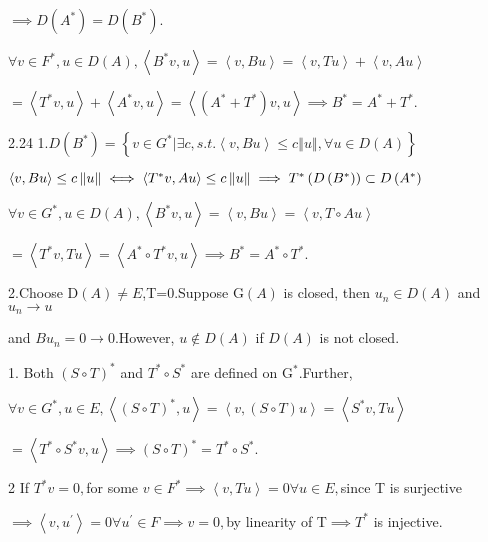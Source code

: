 \documentclass{article}
\begin{document}
$\implies D\left( A^{\ast }\right) =D\left( B^{\ast }\right) .$

$\forall v\in F^{\ast },u\in D\left( A\right) ,\left\langle B^{\ast
}v,u\right\rangle =\left\langle v,Bu\right\rangle =\left\langle
v,Tu\right\rangle +\left\langle v,Au\right\rangle $

$=\left\langle T^{\ast }v,u\right\rangle +\left\langle A^{\ast
}v,u\right\rangle =\left\langle \left( A^{\ast }+T^{\ast }\right)
v,u\right\rangle \implies B^{\ast }=A^{\ast }+T^{\ast }.$

2.24 1.$D\left( B^{\ast }\right) =\left\{ v\in G^{\ast }|\exists
c,s.t.\left\langle v,Bu\right\rangle \leq c\left\Vert u\right\Vert ,\forall
u\in D\left( A\right) \right\} $

$\bigskip \left\langle v,Bu\right\rangle \leq c\left\Vert u\right\Vert \iff
\left\langle T^{\ast }v,Au\right\rangle \leq c\left\Vert u\right\Vert
\implies T^{\ast }\left( D\left( B^{\ast }\right) \right) \subset D\left(
A^{\ast }\right) $

$\forall v\in G^{\ast },u\in D\left( A\right) ,\left\langle B^{\ast
}v,u\right\rangle =\left\langle v,Bu\right\rangle =\left\langle v,T\circ
Au\right\rangle $

$=\left\langle T^{\ast }v,Tu\right\rangle =\left\langle A^{\ast }\circ
T^{\ast }v,u\right\rangle \implies B^{\ast }=A^{\ast }\circ T^{\ast }.$

\bigskip 2.Choose D$\left( A\right) \neq E$,T=0.Suppose G$\left( A\right) $
is closed, then $u_{n}\in D\left( A\right) $ and $u_{n}\rightarrow u$

and $Bu_{n}=0\rightarrow 0.$However, $u\notin D\left( A\right) $ if $D\left(
A\right) $ is not closed. 

 1. Both $\left( S\circ T\right) ^{\ast }$ and $T^{\ast }\circ
S^{\ast }$ are defined on G$^{\ast }.$Further, 

$\forall v\in G^{\ast },u\in E,\left\langle \left( S\circ T\right) ^{\ast
},u\right\rangle =\left\langle v,\left( S\circ T\right) u\right\rangle
=\left\langle S^{\ast }v,Tu\right\rangle $

$=\left\langle T^{\ast }\circ S^{\ast }v,u\right\rangle \implies \left(
S\circ T\right) ^{\ast }=T^{\ast }\circ S^{\ast }.$

2 If $T^{\ast }v=0,$for some $v\in F^{\ast }\implies \left\langle
v,Tu\right\rangle =0\forall u\in E,$since T is surjective

$\implies \left\langle v,u^{\prime }\right\rangle =0\forall u^{\prime }\in
F\implies v=0,$by linearity of T$\implies T^{\ast }$ is injective.
\end{document}
